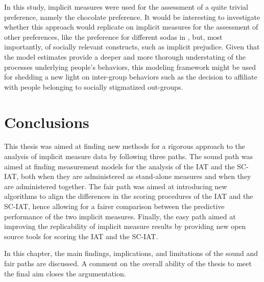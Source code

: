 \documentclass[12pt]{book}
\begin{document}
In this study, implicit measures were used for the assessment of a quite trivial preference, namely the chocolate preference. It would be interesting to investigate whether this approach would replicate on implicit measures for the assessment of other preferences, like the preference for different sodas  in , but, most importantly, of socially relevant constructs, such as implicit prejudice. 
	Given that the model estimates provide a deeper and more thorough understating of the processes underlying people's behaviors, this modeling framework might be used for shedding a new light on inter-group behaviors such as the decision to affiliate with people belonging to socially stigmatized out-groups. 

\chapter[In the end]{Conclusions} \label{chap:conclusions}

This thesis was aimed at finding new methods for a rigorous approach to the analysis of implicit measure data by following three paths. 
The sound path was aimed at finding measurement models for the analysis of the IAT and the SC-IAT, both when they are administered as stand-alone measures and when they are administered together.
The fair path was aimed at introducing new algorithms to align the differences in the scoring procedures of the IAT and the SC-IAT, hence allowing for a fairer comparison between the predictive performance of the two implicit measures. 
Finally, the easy path aimed at improving the replicability of implicit measure results by providing new open source tools for scoring the IAT and the SC-IAT.

In this chapter, the main findings, implications, and limitations of the sound and fair paths are discussed. A comment on the overall ability of the thesis to meet the final aim closes the argumentation.
\end{document}
